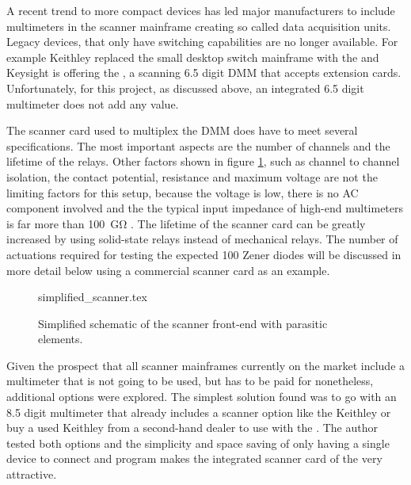 A recent trend to more compact devices has led major manufacturers to include multimeters in the scanner mainframe creating so called data acquisition units. Legacy devices, that only have switching capabilities are no longer available. For example Keithley replaced the small desktop switch mainframe  with the  and Keysight is offering the , a scanning \num{6.5} digit DMM that accepts extension cards. Unfortunately, for this project, as discussed above, an integrated \num{6.5} digit multimeter does not add any value.

The scanner card used to multiplex the DMM does have to meet several specifications. The most important aspects are the number of channels and the lifetime of the relays. Other factors shown in figure \ref{fig:simplified_scanner}, such as channel to channel isolation, the contact potential, resistance and maximum voltage are not the limiting factors for this setup, because the voltage is low, there is no AC component involved and the the typical input impedance of high-end multimeters is far more than \qty{100}{\giga\ohm} \cite{datasheet_fluke8588A,article_3458A_input_impedance_3,datasheet_keithley2002,article_3458A_input_impedance}. The lifetime of the scanner card can be greatly increased by using solid-state relays instead of mechanical relays. The number of actuations required for testing the expected \num{100} Zener diodes will be discussed in more detail below using a commercial scanner card as an example.
\begin{figure}[htb]
    \centering
        {simplified_scanner.tex}
    \caption{Simplified schematic of the scanner front-end with parasitic elements.}
    \label{fig:simplified_scanner}
\end{figure}

Given the prospect that all scanner mainframes currently on the market include a multimeter that is not going to be used, but has to be paid for nonetheless, additional options were explored. The simplest solution found was to go with an \num{8.5} digit multimeter that already includes a scanner option like the Keithley  or buy a used Keithley  from a second-hand dealer to use with the . The author tested both options and the simplicity and space saving of only having a single device to connect and program makes the integrated scanner card of the  very attractive.

